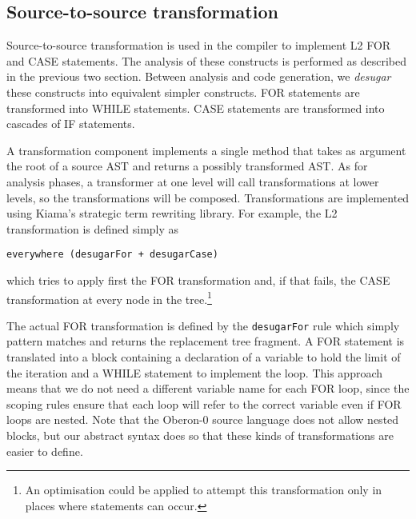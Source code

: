 
\subsection{Source-to-source transformation}

Source-to-source transformation is used in the compiler to implement L2 FOR and CASE statements.
The analysis of these constructs is performed as described in the previous two section.
Between analysis and code generation, we \emph{desugar} these constructs into equivalent simpler constructs.
FOR statements are transformed into WHILE statements.
CASE statements are transformed into cascades of IF statements.

A transformation component implements a single method that takes as argument the root of a source AST and returns a possibly transformed AST.
As for analysis phases, a transformer at one level will call transformations at lower levels, so the transformations will be composed.
Transformations are implemented using Kiama's strategic term rewriting library.
For example, the L2 transformation is defined simply as

\begin{verbatim}
everywhere (desugarFor + desugarCase)
\end{verbatim}

\noindent
which tries to apply first the FOR transformation and, if that fails, the CASE transformation at every node in the tree.\footnote{An optimisation could be applied to attempt this transformation only in places where statements can occur.}

The actual FOR transformation is defined by the \verb|desugarFor| rule which simply pattern matches and returns the replacement tree fragment.
A FOR statement is translated into a block containing a declaration of a variable to hold the limit of the iteration and a WHILE statement to implement the loop.
This approach means that we do not need a different variable name for each FOR loop, since the scoping rules ensure that each loop will refer to the correct variable even if FOR loops are nested.
Note that the Oberon-0 source language does not allow nested blocks, but our abstract syntax does so that these kinds of transformations are easier to define.

